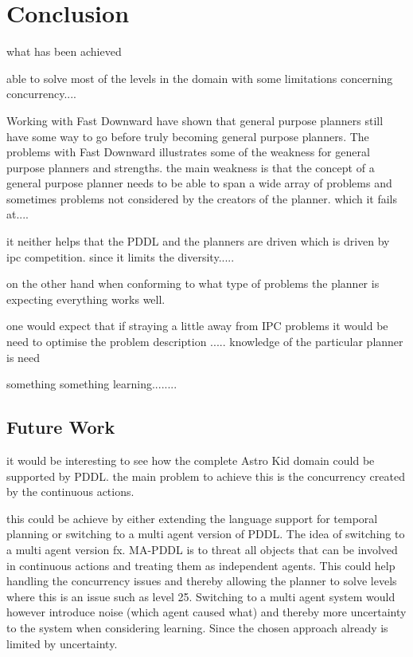 \section{Conclusion}

what has been achieved



able to solve most of the levels in the domain with some limitations concerning concurrency....



Working with Fast Downward have shown that general purpose planners still have some way to go before truly becoming general purpose planners. The problems with Fast Downward illustrates some of the weakness for general purpose planners and strengths. the main weakness is that the concept of a general purpose planner needs to be able to span a wide array of problems and sometimes problems not considered by the creators of the planner. which it fails at....

it neither helps that the PDDL and the planners are driven which is driven by ipc competition. 
 since it limits the diversity..... 
 
 on the other hand when conforming to what type of problems the planner is expecting everything works well.
 
 one would expect that if straying a little away from IPC problems it would be need to optimise the problem description ..... knowledge of the particular planner is need
 
 
 
 
 something something learning........
 
 
\subsection{Future Work}

	it would be interesting to see how the complete Astro Kid domain could be supported by PDDL. the main problem to achieve this is the concurrency created by the continuous actions.
	
	
	this could be achieve by either extending the language support for temporal planning or switching to a multi agent version of PDDL. The idea of switching to a multi agent version fx. MA-PDDL is to threat all objects that can be involved in continuous actions and treating them as independent agents. This could help handling the concurrency issues and thereby allowing the planner to solve levels where this is an issue such as level 25. Switching to a multi agent system would however introduce noise (which agent caused what) and thereby more uncertainty to the system when considering learning. Since the chosen approach already is limited by uncertainty.
	
